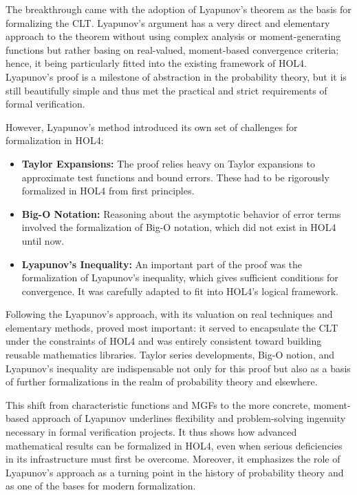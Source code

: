 The breakthrough came with the adoption of Lyapunov's theorem as the basis for formalizing the CLT.  Lyapunov's argument has a very direct and elementary approach to the theorem without using complex analysis or moment-generating functions but rather basing on real-valued, moment-based convergence criteria; hence, it being particularly fitted into the existing framework of HOL4. Lyapunov's proof is a milestone of abstraction in the probability theory, but it is still beautifully simple and thus met the practical and strict requirements of formal verification.

However, Lyapunov’s method introduced its own set of challenges for formalization in HOL4:
\begin{itemize}
    \item \textbf{Taylor Expansions:} The proof relies heavy on Taylor expansions to approximate test functions and bound errors. These had to be rigorously formalized in HOL4 from first principles.
    \item \textbf{Big-O Notation:} Reasoning about the asymptotic behavior of error terms involved the formalization of Big-O notation, which did not exist in HOL4 until now.
    \item \textbf{Lyapunov's Inequality:} An important part of the proof was the formalization of Lyapunov's inequality, which gives sufficient conditions for convergence. It was carefully adapted to fit into HOL4's logical framework.
\end{itemize}

Following the Lyapunov's approach, with its valuation on real techniques and elementary methods, proved most important: it served to encapsulate the CLT under the constraints of HOL4 and was entirely consistent toward building reusable mathematics libraries. Taylor series developments, Big-O notion, and Lyapunov's inequality are indispensable not only for this proof but also as a basis of further formalizations in the realm of probability theory and elsewhere.

This shift from characteristic functions and MGFs to the more concrete, moment-based approach of Lyapunov underlines flexibility and problem-solving ingenuity necessary in formal verification projects. It thus shows how advanced mathematical results can be formalized in HOL4, even when serious deficiencies in its infrastructure must first be overcome. Moreover, it emphasizes the role of Lyapunov's approach as a turning point in the history of probability theory and as one of the bases for modern formalization.


